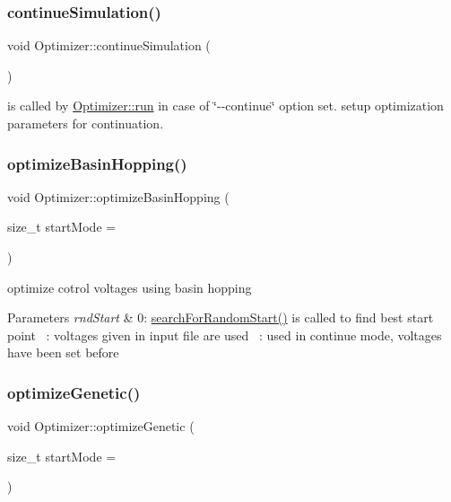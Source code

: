 \subsubsection{\texorpdfstring{continue\+Simulation()}{continueSimulation()}}
{\footnotesize\ttfamily void Optimizer\+::continue\+Simulation (\begin{DoxyParamCaption}{ }\end{DoxyParamCaption})\hspace{0.3cm}{\ttfamily [private]}}

is called by \hyperlink{classOptimizer_aa9fdb7cd911fdd9fbfaf3fc8d86ea408}{Optimizer\+::run} in case of \char`\"{}-\/-\/continue\char`\"{} option set. setup optimization parameters for continuation. \mbox{\label{classOptimizer_a53f16ba66dc160c7f7c8e27e8e3de90f}} 
\subsubsection{\texorpdfstring{optimize\+Basin\+Hopping()}{optimizeBasinHopping()}}
{\footnotesize\ttfamily void Optimizer\+::optimize\+Basin\+Hopping (\begin{DoxyParamCaption}\item[{size\+\_\+t}]{start\+Mode = {} }\end{DoxyParamCaption})\hspace{0.3cm}{\ttfamily [private]}}

optimize cotrol voltages using basin hopping 
\begin{DoxyParams}{Parameters}
{\em rnd\+Start} & 0\+: \hyperlink{classOptimizer_a5dfd9a3a649ffa7e064c49d00afdb384}{search\+For\+Random\+Start()} is called to find best start point ~\+: voltages given in input file are used ~\+: used in continue mode, voltages have been set before \\
\hline
\end{DoxyParams}
\mbox{\label{classOptimizer_a927fdf3177a1e0479d2caf69af541c5d}} 
\subsubsection{\texorpdfstring{optimize\+Genetic()}{optimizeGenetic()}}
{\footnotesize\ttfamily void Optimizer\+::optimize\+Genetic (\begin{DoxyParamCaption}\item[{size\+\_\+t}]{start\+Mode = {} }\end{DoxyParamCaption})\hspace{0.3cm}{\ttfamily [private]}}

